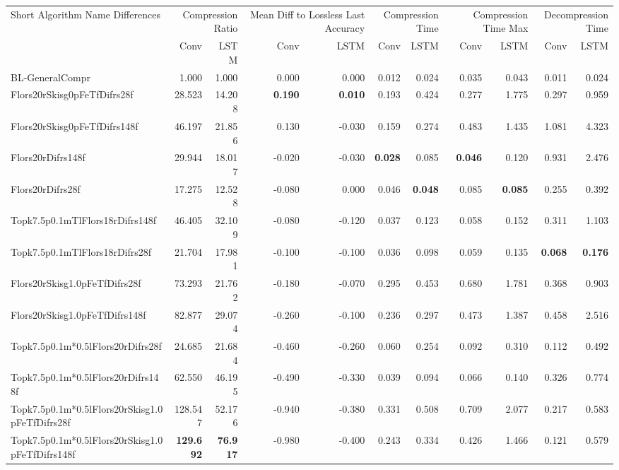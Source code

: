 \begin{tabular}{lrrrrrrrrrr}
\toprule
\multicolumn{1}{p{2.5cm}}{Short Algorithm Name Differences} & \multicolumn{2}{p{1.7cm}}{Compression Ratio} & \multicolumn{2}{p{1.7cm}}{Mean Diff to Lossless Last Accuracy} & \multicolumn{2}{p{1.7cm}}{Compression Time} & \multicolumn{2}{p{1.7cm}}{Compression Time Max} & \multicolumn{2}{p{1.7cm}}{Decompression Time} \\
 & Conv & LSTM & Conv & LSTM & Conv & LSTM & Conv & LSTM & Conv & LSTM \\
\midrule
BL-GeneralCompr & 1.000 & 1.000 & 0.000 & 0.000 & 0.012 & 0.024 & 0.035 & 0.043 & 0.011 & 0.024 \\
Flors20rSkisg0pFeTfDifrs28f & 28.523 & 14.208 & \bfseries 0.190 & \bfseries 0.010 & 0.193 & 0.424 & 0.277 & 1.775 & 0.297 & 0.959 \\
Flors20rSkisg0pFeTfDifrs148f & 46.197 & 21.856 & 0.130 & -0.030 & 0.159 & 0.274 & 0.483 & 1.435 & 1.081 & 4.323 \\
Flors20rDifrs148f & 29.944 & 18.017 & -0.020 & -0.030 & \bfseries 0.028 & 0.085 & \bfseries 0.046 & 0.120 & 0.931 & 2.476 \\
Flors20rDifrs28f & 17.275 & 12.528 & -0.080 & 0.000 & 0.046 & \bfseries 0.048 & 0.085 & \bfseries 0.085 & 0.255 & 0.392 \\
Topk7.5p0.1mTlFlors18rDifrs148f & 46.405 & 32.109 & -0.080 & -0.120 & 0.037 & 0.123 & 0.058 & 0.152 & 0.311 & 1.103 \\
Topk7.5p0.1mTlFlors18rDifrs28f & 21.704 & 17.981 & -0.100 & -0.100 & 0.036 & 0.098 & 0.059 & 0.135 & \bfseries 0.068 & \bfseries 0.176 \\
Flors20rSkisg1.0pFeTfDifrs28f & 73.293 & 21.762 & -0.180 & -0.070 & 0.295 & 0.453 & 0.680 & 1.781 & 0.368 & 0.903 \\
Flors20rSkisg1.0pFeTfDifrs148f & 82.877 & 29.074 & -0.260 & -0.100 & 0.236 & 0.297 & 0.473 & 1.387 & 0.458 & 2.516 \\
Topk7.5p0.1m*0.5lFlors20rDifrs28f & 24.685 & 21.684 & -0.460 & -0.260 & 0.060 & 0.254 & 0.092 & 0.310 & 0.112 & 0.492 \\
Topk7.5p0.1m*0.5lFlors20rDifrs148f & 62.550 & 46.195 & -0.490 & -0.330 & 0.039 & 0.094 & 0.066 & 0.140 & 0.326 & 0.774 \\
Topk7.5p0.1m*0.5lFlors20rSkisg1.0pFeTfDifrs28f & 128.547 & 52.176 & -0.940 & -0.380 & 0.331 & 0.508 & 0.709 & 2.077 & 0.217 & 0.583 \\
Topk7.5p0.1m*0.5lFlors20rSkisg1.0pFeTfDifrs148f & \bfseries 129.692 & \bfseries 76.917 & -0.980 & -0.400 & 0.243 & 0.334 & 0.426 & 1.466 & 0.121 & 0.579 \\
\bottomrule
\end{tabular}

